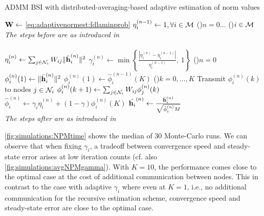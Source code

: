 \documentclass{article}
\begin{document}
\begin{algorithm}[t]
    \caption{ADMM BSI with distributed-averaging-based adaptive estimation of norm values}\label{alg:davg_norm_est}
    \(\bm{\mathrm{W}} \gets\) \eqref{eq:adaptivenormest:fdlaminprob}\;
    \(\eta_i^{(n-1)} \gets 1, \forall i \in \mathcal{M}\)\;
    \For(){\(n=0\dots\)}
    {
        \For(){\(i \in \mathcal{M}\)}
        {
            \emph{The steps before are as introduced in }\cite{blochbergerDBSI}\\
            \dotfill\\
            \(\eta_i^{(n)} \gets \sum_{j \in \mathcal{N}_i} W_{ij} \|\bar{\bm{\mathrm{h}}}_i^{(n)}\|^2\)\;
            \(\gamma_i^{(n)} \gets \min \left\lbrace \frac{| \eta_i^{(n)} - \eta_i^{(n-1)} |}{\eta_i^{(n-1)}},\,1\right\rbrace\)\;
            \eIf(){\(n = 0\)}
            {
                \(\phi_i^{(n)}(1) \gets \|\bar{\bm{\mathrm{h}}}_i^{(n)}\|^2\)\;
            }
            {
                \(\phi_i^{(n)}(1) \gets \hat{\phi}_i^{(n-1)}(K)\)\;
            }
            \For(){\(k=0,\dots,K\)}
            {
                Transmit \(\phi_i^{(n)}(k)\) to nodes  \(j \in \mathcal{N}_i\)\;
                \(\phi_i^{(n)}({k+1}) \gets \sum_{j \in \mathcal{N}_i} W_{ij} \phi_j^{(n)}({k})\)\;
            }
            \(\hat{\phi}_i^{(n)} \gets \gamma_i \eta_i^{(n)} + (1-\gamma) \phi_i^{(n)}(K)\)\;
            \(\hat{\bm{\mathrm{h}}_i}^{(n)} \gets \frac{\bar{\bm{\mathrm{h}}}_i^{(n)}}{\sqrt{\hat{\phi}_i^{(n)}M}}\)\;
            \dotfill\\
            \emph{The steps after are as introduced in }\cite{blochbergerDBSI}\\
        }
    }
\end{algorithm}
\autoref{fig:simulations:NPMtime} shows the median of 30 Monte-Carlo runs.
We can observe that when fixing \(\gamma_i\), a tradeoff between convergence speed and steady-state error arises at low iteration counts (cf. also \autoref{fig:simulations:avgNPMgamma}).
With \(K=10\), the performance comes close to the optimal case at the cost of additional communication between nodes.
This in contrast to the case with adaptive \(\gamma_i\) where even at \(K=1\), i.e., no additional communication for the recursive estimation scheme, convergence speed and steady-state error are close to the optimal case.
\end{document}
